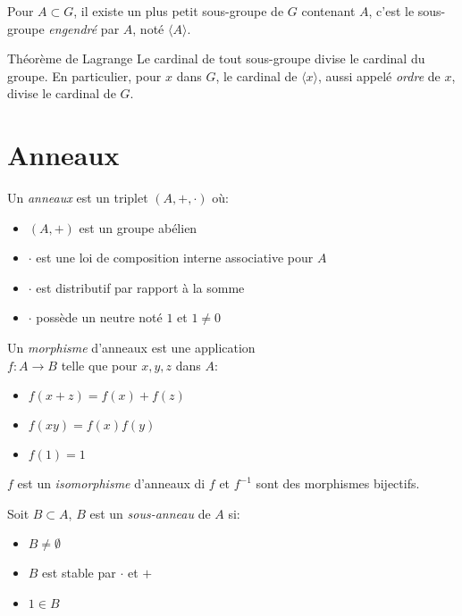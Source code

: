 \documentclass[french, a4paper, 11pt, twocolumn]{article}
\begin{document}
\begin{definition}
  Pour $A\subset G$, il existe un plus petit sous-groupe de $G$ contenant $A$, c'est le sous-groupe \emph{engendré} par $A$, noté $\langle A\rangle$.
\end{definition}

\begin{theoreme}{Théorème de Lagrange}
  Le cardinal de tout sous-groupe divise le cardinal du groupe.
  \tcblower
  En particulier, pour $x$ dans $G$, le cardinal de $\langle x \rangle$, aussi appelé \emph{ordre} de $x$, divise le cardinal de $G$.
\end{theoreme}

\section{Anneaux}
\begin{definition}
  Un \emph{anneaux} est un triplet $(A, +, \cdot)$ où:
  \begin{itemize}[label=$\bullet$]
    \item $(A,+)$ est un groupe abélien
    \item $\cdot$ est une loi de composition interne associative pour $A$
    \item $\cdot$ est distributif par rapport à la somme
    \item $\cdot$ possède un neutre noté $1$ et $1\neq 0$
  \end{itemize}
\end{definition}

\begin{definition}
  Un \emph{morphisme} d'anneaux est une application\\
  $f:A\rightarrow B$ telle que pour $x,y,z$ dans $A$:
  \begin{itemize}[label=$\bullet$]
    \item $f(x+z)=f(x)+f(z)$
    \item $f(xy)=f(x)f(y)$
    \item $f(1)=1$
  \end{itemize}
  $f$ est un \emph{isomorphisme} d'anneaux di $f$ et $f^{-1}$ sont des morphismes bijectifs.
\end{definition}

\begin{definition}
  Soit $B\subset A$, $B$ est un \emph{sous-anneau} de $A$ si:
  \begin{itemize}[label=$\bullet$]
    \item $B\neq\emptyset$
    \item $B$ est stable par $\cdot$ et $+$
    \item $1\in B$
  \end{itemize}
\end{definition}
\end{document}
